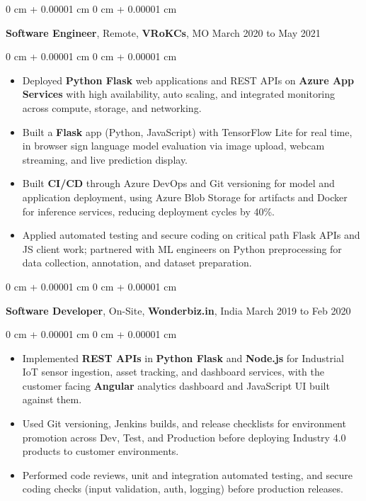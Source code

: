 \documentclass[10pt, letterpaper]{article}
\newenvironment{highlights}{
    \begin{itemize}[
        topsep=0.04 cm,
        parsep=0.04 cm,
        partopsep=0pt,
        itemsep=0pt,
        leftmargin=0 cm + 10pt
    ]
}{
    \end{itemize}
} %
\newenvironment{onecolentry}{
    \begin{adjustwidth}{
        0 cm + 0.00001 cm
    }{
        0 cm + 0.00001 cm
    }
}{
    \end{adjustwidth}
} %
\newcommand{\resumeheading}[2]{%
    \begin{onecolentry}
        #1 \hfill #2
    \end{onecolentry}
} %
\begin{document}
\vspace{0.15 cm}
\resumeheading{\textbf{Software Engineer}, Remote, \textbf{VRoKCs}, MO}{March 2020 to May 2021}
\begin{onecolentry}
\begin{highlights}
	\item Deployed \textbf{Python Flask} web applications and REST APIs on \textbf{Azure App Services} with high availability, auto scaling, and integrated monitoring across compute, storage, and networking.
	\item Built a \textbf{Flask} app (Python, JavaScript) with TensorFlow Lite for real time, in browser sign language model evaluation via image upload, webcam streaming, and live prediction display.
	\item Built \textbf{CI/CD} through Azure DevOps and Git versioning for model and application deployment, using Azure Blob Storage for artifacts and Docker for inference services, reducing deployment cycles by 40\%.
	\item Applied automated testing and secure coding on critical path Flask APIs and JS client work; partnered with ML engineers on Python preprocessing for data collection, annotation, and dataset preparation.
\end{highlights}
\end{onecolentry}





\vspace{0.15 cm}
\resumeheading{\textbf{Software Developer}, On-Site, \textbf{Wonderbiz.in}, India}{March 2019 to Feb 2020}

\begin{onecolentry}
\begin{highlights}
	\item Implemented \textbf{REST APIs} in \textbf{Python Flask} and \textbf{Node.js} for Industrial IoT sensor ingestion, asset tracking, and dashboard services, with the customer facing \textbf{Angular} analytics dashboard and JavaScript UI built against them.
	\item Used Git versioning, Jenkins builds, and release checklists for environment promotion across Dev, Test, and Production before deploying Industry 4.0 products to customer environments.
	\item Performed code reviews, unit and integration automated testing, and secure coding checks (input validation, auth, logging) before production releases.
\end{highlights}
\end{onecolentry}
\end{document}
